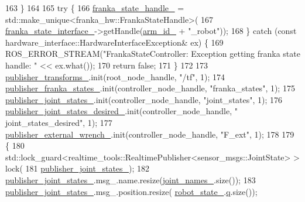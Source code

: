 \begin{DoxyCode}
163   \}
164 
165   \textcolor{keywordflow}{try} \{
166     \hyperlink{classfranka__control_1_1FrankaStateController_a7f665b5f5fda44bcfa5f0703806d0048}{franka\_state\_handle\_} = std::make\_unique<franka\_hw::FrankaStateHandle>(
167         \hyperlink{classfranka__control_1_1FrankaStateController_a3691177b860e7ea1bcaa323ccdfa86d0}{franka\_state\_interface\_}->getHandle(\hyperlink{classfranka__control_1_1FrankaStateController_a603d865facc13c7b1f2ebb5a27404221}{arm\_id\_} + \textcolor{stringliteral}{"\_robot"}));
168   \} \textcolor{keywordflow}{catch} (\textcolor{keyword}{const} hardware\_interface::HardwareInterfaceException& ex) \{
169     ROS\_ERROR\_STREAM(\textcolor{stringliteral}{"FrankaStateController: Exception getting franka state handle: "} << ex.what());
170     \textcolor{keywordflow}{return} \textcolor{keyword}{false};
171   \}
172 
173   \hyperlink{classfranka__control_1_1FrankaStateController_a3466cae3276a7576686661ecbe05a649}{publisher\_transforms\_}.init(root\_node\_handle, \textcolor{stringliteral}{"/tf"}, 1);
174   \hyperlink{classfranka__control_1_1FrankaStateController_a2ec0c84ee9474f84577a740360aae2e3}{publisher\_franka\_states\_}.init(controller\_node\_handle, \textcolor{stringliteral}{"franka\_states"}, 1);
175   \hyperlink{classfranka__control_1_1FrankaStateController_a9cc0cb3e247d25ef305170666b48ec72}{publisher\_joint\_states\_}.init(controller\_node\_handle, \textcolor{stringliteral}{"joint\_states"}, 1);
176   \hyperlink{classfranka__control_1_1FrankaStateController_aff239ebea490b911ac660c5b79f6308d}{publisher\_joint\_states\_desired\_}.init(controller\_node\_handle, \textcolor{stringliteral}{"
      joint\_states\_desired"}, 1);
177   \hyperlink{classfranka__control_1_1FrankaStateController_aeff7a641817b5261934421fcbd1205f5}{publisher\_external\_wrench\_}.init(controller\_node\_handle, \textcolor{stringliteral}{"F\_ext"}, 1);
178 
179   \{
180     std::lock\_guard<realtime\_tools::RealtimePublisher<sensor\_msgs::JointState> > lock(
181         \hyperlink{classfranka__control_1_1FrankaStateController_a9cc0cb3e247d25ef305170666b48ec72}{publisher\_joint\_states\_});
182     \hyperlink{classfranka__control_1_1FrankaStateController_a9cc0cb3e247d25ef305170666b48ec72}{publisher\_joint\_states\_}.msg\_.name.resize(\hyperlink{classfranka__control_1_1FrankaStateController_afb6dc481c4d282d5f8f830f0cf943404}{joint\_names\_}.size());
183     \hyperlink{classfranka__control_1_1FrankaStateController_a9cc0cb3e247d25ef305170666b48ec72}{publisher\_joint\_states\_}.msg\_.position.resize(
      \hyperlink{classfranka__control_1_1FrankaStateController_a0d097abb2665aadbc8d38662bba5ae8b}{robot\_state\_}.\hyperlink{structfranka_1_1RobotState_ade3335d1ac2f6c44741a916d565f7091}{q}.size());

\end{DoxyCode}
